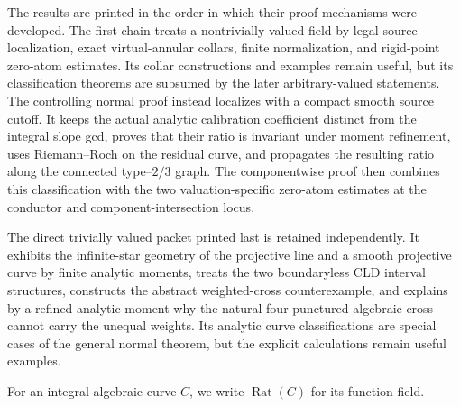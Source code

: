 The results are printed in the order in which their proof mechanisms were
developed.  The first chain treats a nontrivially valued field by legal source
localization, exact virtual-annular collars, finite normalization, and
rigid-point zero-atom estimates.  Its collar constructions and examples remain
useful, but its classification theorems are subsumed by the later
arbitrary-valued statements.  The controlling normal proof instead localizes
with a compact smooth source cutoff.  It keeps the actual analytic
calibration coefficient distinct from the integral slope gcd, proves that
their ratio is invariant under moment refinement, uses Riemann--Roch on the
residual curve, and propagates the resulting ratio along the connected
type--$2/3$ graph.  The componentwise proof then combines this classification
with the two valuation-specific zero-atom estimates at the conductor and
component-intersection locus.

The direct trivially valued packet printed last is retained independently.  It
exhibits the infinite-star geometry of the projective line and a smooth
projective curve by finite analytic moments, treats the two boundaryless CLD
interval structures, constructs the abstract weighted-cross counterexample,
and explains by a refined analytic moment why the natural four-punctured
algebraic cross cannot carry the unequal weights.  Its analytic curve
classifications are special cases of the general normal theorem, but the
explicit calculations remain useful examples.

For an integral algebraic curve $C$, we write
$\operatorname{Rat}(C)$ for its function field.












